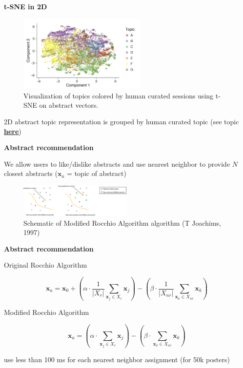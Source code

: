 \begin{frame}{\textbf{t-SNE in 2D}}

\begin{figure}
\includegraphics[width=2.5in]{images/tsne}\\
\tiny{Visualization of topics colored by human curated sessions using t-SNE on abstract vectors.}
\end{figure}

2D abstract topic representation is grouped by human curated topic
(see topic \href{https://github.com/titipata/science_concierge/wiki/Topic-in-SfN-2015}{\textbf{here}})

\end{frame}


\begin{frame}{\textbf{Abstract recommendation}}

We allow users to like/dislike abstracts and use nearest neighbor to provide $N$ closest abstracts ($\mathbf{x}_a$ = topic of abstract)

\begin{figure}
\includegraphics[width=2.2in]{images/like-dislike}\\
\tiny{Schematic of Modified Rocchio Algorithm algorithm (T Joachims, 1997)}
\end{figure}

\end{frame}


\begin{frame}{\textbf{Abstract recommendation}}

Original Rocchio Algorithm

\begin{equation*}
\mathbf{x}_a = \mathbf{x}_0 + (\alpha \cdot \frac{1}{\left| X_r \right|} \sum_{\mathbf{x}_j \in X_r} \mathbf{x}_j) - (\beta \cdot \frac{1}{\left| X_{nr} \right|} \sum_{\mathbf{x}_k \in X_{nr}} \mathbf{x}_k)
\end{equation*}

Modified Rocchio Algorithm

\begin{equation*}
\mathbf{x}_a = (\alpha \cdot \sum_{\mathbf{x}_j \in X_r} \mathbf{x}_j) - (\beta \cdot \sum_{\mathbf{x}_k \in X_{nr}} \mathbf{x}_k)
\end{equation*}

use less than 100 ms for each nearest neighbor assignment (for 50k posters)

\end{frame}
